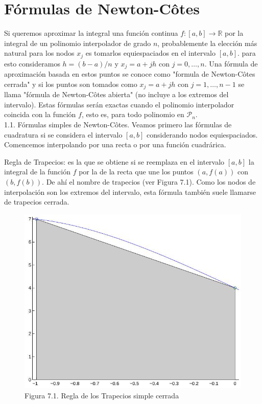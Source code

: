 \documentclass[10pt]{book}
\begin{document}
\section{Fórmulas de Newton-Côtes}
Si queremos aproximar la integral una función continua $f:[a, b] \rightarrow \mathbb{R}$ por la integral de un polinomio interpolador de grado $n$, probablemente la elección más natural para los nodos $x_{j}$ es tomarlos equiespaciados en el intervalo $[a, b]$. para esto consideramos $h=(b-a) / n$ y $x_{j}=a+j h$ con $j=0, \ldots, n$. Una fórmula de aproximación basada en estos puntos se conoce como "formula de Newton-Côtes cerrada" y si los puntos son tomados como $x_{j}=a+j h$ con $j=1, \ldots, n-1$ se llama "fórmula de Newton-Côtes abierta" (no incluye a los extremos del intervalo). Estas fórmulas serán exactas cuando el polinomio interpolador coincida con la función $f$, esto es, para todo polinomio en $\mathcal{P}_{n}$.\\
1.1. Fórmulas simples de Newton-Côtes. Veamos primero las fórmulas de cuadratura si se considera el intervalo $[a, b]$ considerando nodos equiespaciados. Comencemos interpolando por una recta o por una función cuadrárica.

Regla de Trapecios: es la que se obtiene si se reemplaza en el intervalo $[a, b]$ la integral de la función $f$ por la de la recta que une los puntos $(a, f(a))$ con $(b, f(b))$. De ahí el nombre de trapecios (ver Figura 7.1). Como los nodos de interpolación son los extremos del intervalo, esta fórmula también suele llamarse de trapecios cerrada.

\begin{figure}[h]
\begin{center}
  \includegraphics[width=\textwidth]{2025_09_05_3888c9ac96bd653d96b4g-139}
\captionsetup{labelformat=empty}
\caption{Figura 7.1. Regla de los Trapecios simple cerrada}
\end{center}
\end{figure}
\end{document}
